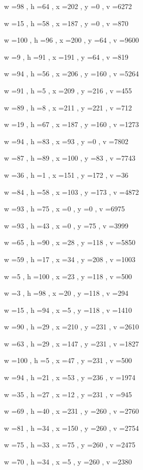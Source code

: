 \documentclass[11pt]{article}
\begin{document}
w =98 , h =64 , x =202 , y =0 , v =6272
\par
w =15 , h =58 , x =187 , y =0 , v =870
\par
w =100 , h =96 , x =200 , y =64 , v =9600
\par
w =9 , h =91 , x =191 , y =64 , v =819
\par
w =94 , h =56 , x =206 , y =160 , v =5264
\par
w =91 , h =5 , x =209 , y =216 , v =455
\par
w =89 , h =8 , x =211 , y =221 , v =712
\par
w =19 , h =67 , x =187 , y =160 , v =1273
\par
w =94 , h =83 , x =93 , y =0 , v =7802
\par
w =87 , h =89 , x =100 , y =83 , v =7743
\par
w =36 , h =1 , x =151 , y =172 , v =36
\par
w =84 , h =58 , x =103 , y =173 , v =4872
\par
w =93 , h =75 , x =0 , y =0 , v =6975
\par
w =93 , h =43 , x =0 , y =75 , v =3999
\par
w =65 , h =90 , x =28 , y =118 , v =5850
\par
w =59 , h =17 , x =34 , y =208 , v =1003
\par
w =5 , h =100 , x =23 , y =118 , v =500
\par
w =3 , h =98 , x =20 , y =118 , v =294
\par
w =15 , h =94 , x =5 , y =118 , v =1410
\par
w =90 , h =29 , x =210 , y =231 , v =2610
\par
w =63 , h =29 , x =147 , y =231 , v =1827
\par
w =100 , h =5 , x =47 , y =231 , v =500
\par
w =94 , h =21 , x =53 , y =236 , v =1974
\par
w =35 , h =27 , x =12 , y =231 , v =945
\par
w =69 , h =40 , x =231 , y =260 , v =2760
\par
w =81 , h =34 , x =150 , y =260 , v =2754
\par
w =75 , h =33 , x =75 , y =260 , v =2475
\par
w =70 , h =34 , x =5 , y =260 , v =2380
\par
\newpage
\end{document}
